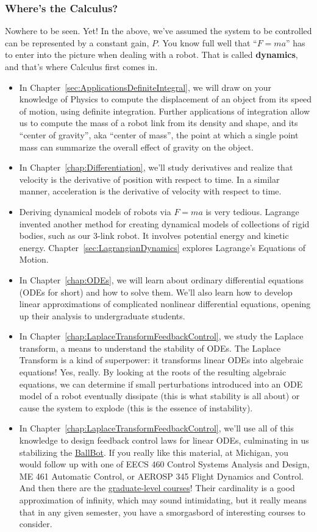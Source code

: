 \subsubsection{Where's the Calculus?}
Nowhere to be seen. Yet! In the above, we've assumed the system to be controlled can be represented by a constant gain, $P$. You know full well that ``$F = ma$'' has to enter into the picture when dealing with a robot. That is called \textbf{dynamics}, and that's where Calculus first comes in. 
\begin{itemize}
\item In Chapter~\ref{sec:ApplicationsDefiniteIntegral}, we will draw on your knowledge of Physics to compute the displacement of an object from its speed of motion, using definite integration. Further applications of integration allow us to compute the mass of a robot link from its density and shape, and its ``center of gravity'', aka ``center of mass'', the point at which a single point mass can summarize the overall effect of gravity on the object. 
    \item In Chapter~\ref{chap:Differentiation}, we'll study derivatives and realize that velocity is the derivative of position with respect to time. In a similar manner, acceleration is the derivative of velocity with respect to time.
    \item Deriving dynamical models of robots via $F = ma$ is very tedious. Lagrange invented another method for creating dynamical models of collections of rigid bodies, such as our 3-link robot. It involves potential energy and kinetic energy. Chapter~\ref{sec:LagrangianDynamics} explores Lagrange's Equations of Motion.
    \item In Chapter~\ref{chap:ODEs}, we will learn about ordinary differential equations (ODEs for short) and how to solve them. We'll also learn how to develop linear approximations of complicated nonlinear differential equations, opening up their analysis to undergraduate students.
    \item In Chapter~\ref{chap:LaplaceTransformFeedbackControl}, we study the Laplace transform, a means to understand the stability of ODEs. The Laplace Transform is a kind of superpower: it transforms linear ODEs into algebraic equations! Yes, really. By looking at the roots of the resulting algebraic equations, we can determine if small perturbations introduced into an ODE model of a robot eventually dissipate (this is what stability is all about) or cause the system to explode (this is the essence of instability). 
    \item In Chapter~\ref{chap:LaplaceTransformFeedbackControl}, we'll use all of this knowledge to design feedback control laws for linear ODEs, culminating in us stabilizing the \href{https://github.com/michiganrobotics/rob311}{BallBot}. If you really like this material, at Michigan, you would follow up with one of EECS 460 Control Systems Analysis and Design, ME 461 Automatic Control, or AEROSP 345 Flight Dynamics and Control. And then there are the \href{https://controls.engin.umich.edu/control-courses/}{graduate-level courses}! Their cardinality is a good approximation of infinity, which may sound intimidating, but it really means that in any given semester, you have a smorgasbord of interesting courses to consider.

\end{itemize}
